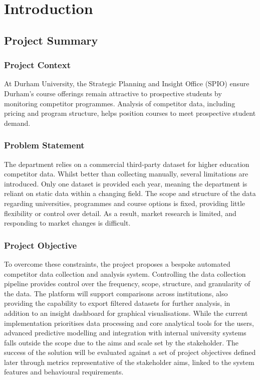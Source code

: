 \section{Introduction}

\subsection{Project Summary}

\subsubsection{Project Context}
At Durham University, the Strategic Planning and Insight Office (SPIO) ensure Durham's course offerings remain attractive to prospective students by monitoring competitor programmes. Analysis of competitor data, including pricing and program structure, helps position courses to meet prospective student demand. 

\subsubsection{Problem Statement}
The department relies on a commercial third-party dataset for higher education competitor data. Whilst better than collecting manually, several limitations are introduced. Only one dataset is provided each year, meaning the department is reliant on static data within a changing field. The scope and structure of the data regarding universities, programmes and course options is fixed, providing little flexibility or control over detail. As a result, market research is limited, and responding to market changes is difficult. 

\subsubsection{Project Objective}
To overcome these constraints, the project proposes a bespoke automated competitor data collection and analysis system. Controlling the data collection pipeline provides control over the frequency, scope, structure, and granularity of the data. The platform will support comparisons across institutions, also providing the capability to export filtered datasets for further analysis, in addition to an insight dashboard for graphical visualisations. While the current implementation prioritises data processing and core analytical tools for the users, advanced predictive modelling and integration with internal university systems falls outside the scope due to the aims and scale set by the stakeholder. 
The success of the solution will be evaluated against a set of project objectives defined later through metrics representative of the stakeholder aims, linked to the system features and behavioural requirements.

